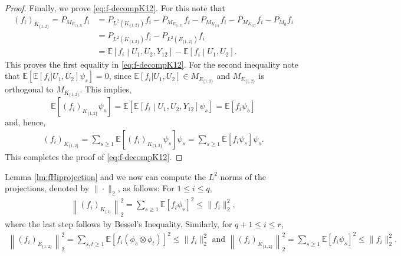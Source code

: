 \documentclass[11pt,reqno]{amsart}
\numberwithin{equation}{section}
\theoremstyle{definition}
\begin{document}
\begin{proof}
Finally, we prove \eqref{eq:f-decompK12}. For this note that 
\begin{align}\label{eq:fK12asEU}
    (f_{i})_{K_{\{1,2\}}} = P_{M_{K_{\{1,2\}}}}f_{i} 
    & = P_{L^2(K_{\{1,2\}})}f_{i} -P_{M_{E_{\{1,2\}}}}f_{i}- P_{M_{K_{\{1\}}}}f_{i} - P_{M_{K_{\{2\}}}}f_{i} -P_{M_\emptyset}f_{i}\nonumber\\
    & = P_{L^2(K_{\{1,2\}})}f_{i} - P_{L^{2}(E_{\{1,2\}})}f_{i}\nonumber\\
    & = \mathbb{E}\left[f_{i}\middle| U_{1},U_{2},Y_{12}\right] - \mathbb{E}\left[f_{i}\middle| U_{1},U_{2}\right].
\end{align} 
This proves the first equality in \eqref{eq:f-decompK12}. For the second inequality note that $\mathbb E[ \mathbb E[f_{i}|U_1, U_2] \psi_s ] =0$, 
since $\mathbb E[f_{i}|U_1, U_2] \in M_{E_{\{1,2\}}}$ and $M_{E_{\{1,2\}}}$ is orthogonal to $M_{K_{\{1,2\}}}$. This implies, 
$$\mathbb E[ (f_{i})_{K_{\{1,2\}}} \psi_s]  = \mathbb E[ \mathbb{E}\left[f_{i}\middle| U_{1},U_{2},Y_{12}\right] \psi_s] = \mathbb E[ f_{i} \psi_s]$$ and, hence,  
\begin{align}\label{eq:fprojectionK12}
(f_{i})_{K_{\{1,2\}}} = \sum_{s \geq 1} \mathbb E[ (f_{i})_{K_{\{1,2\}}}  \psi_s ]  \psi_s = \sum_{s \geq 1} \mathbb E[ f_{i}  \psi_s ]  \psi_s. 
\end{align} 
This completes the proof of \eqref{eq:f-decompK12}. 
\end{proof}
Lemma \ref{lm:fHiprojection} and \cite[Chapter 6, Lemma 8]{laxfunctional} we now can compute the $L^{2}$ norms of the projections, denoted by $\| \cdot \|_2$, as follows: For $1 \leq i \leq q$,   
\begin{align}\label{eq:finite-expansionK1} 
	\left\|(f_{i})_{K_{\{1\}}}\right\|_{2}^{2} = \sum_{s \geq 1}\mathbb{E}\left[f_{i}\phi_{s}\right]^2 \leq \|f_{i}\|_{2}^{2}  , 
	\end{align} 
	where the last step follows by Bessel's Inequality. Similarly, for $q+1 \leq i \leq r$, 
	\begin{align}\label{eq:finite-expansionK12}
	\left\| (f_{i})_{E_{\{1,2\}}}\right\|_{2}^{2} = \sum_{s, t \geq 1}\mathbb{E}\left[f_{i}(\phi_{s}\otimes\phi_{t}) \right]^2  \leq \|f_{i}\|_{2}^{2} \text{ and }  \left\|(f_{i})_{K_{\{1,2\}}}\right\|_{2}^{2} = \sum_{s \geq 1}\mathbb{E}\left[f_{i}\psi_{s}\right]^2 \leq \|f_{i}\|_{2}^{2} . 
\end{align}
\end{document}
